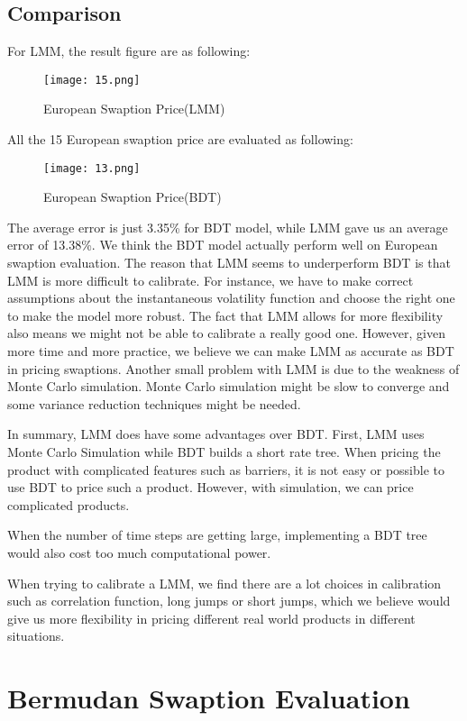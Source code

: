 \documentclass[paper = letterpaper, fontsize=12pt]{article}
\begin{document}
\subsection{Comparison}
For LMM, the result figure are as following:
\begin{figure}[H]
    \centering
    \texttt{[image: 15.png]}
    \caption{European Swaption Price(LMM)}
\end{figure}

All the 15 European swaption price are evaluated as following:
\begin{figure}[H]
    \centering
    \texttt{[image: 13.png]}
    \caption{European Swaption Price(BDT)}
\end{figure}

The average error is just 3.35\% for BDT model, while LMM gave us an average error of 13.38\%. We think the BDT model actually perform well on European swaption evaluation. The reason that LMM seems to underperform BDT is that LMM is more difficult to calibrate. For instance, we have to make correct assumptions about the instantaneous volatility function and choose the right one to make the model more robust. The fact that LMM allows for more flexibility also means we might not be able to calibrate a really good one. However, given more time and more practice, we believe we can make LMM as accurate as BDT in pricing swaptions. Another small problem with LMM is due to the weakness of Monte Carlo simulation. Monte Carlo simulation might be slow to converge and some variance reduction techniques might be needed. 

In summary, LMM does have some advantages over BDT. First, LMM uses Monte Carlo Simulation while BDT builds a short rate tree. When pricing the product with complicated features such as barriers, it is not easy or possible to use BDT to price such a product. However, with simulation, we can price complicated products.

When the number of time steps are getting large, implementing a BDT tree would also cost too much computational power.

When trying to calibrate a LMM, we find there are a lot choices in calibration such as correlation function, long jumps or short jumps, which we believe would give us more flexibility in pricing different real world products in different situations.




\section{Bermudan Swaption Evaluation}
\end{document}
